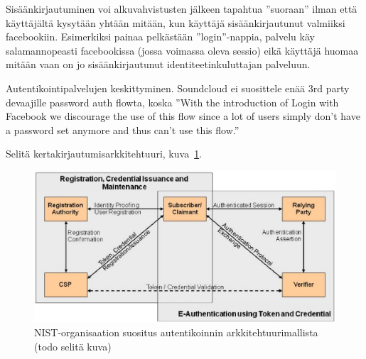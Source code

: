 \documentclass[finnish,gradu]{tktltiki}
\begin{document}
  Sisäänkirjautuminen voi alkuvahvistusten jälkeen tapahtua ''suoraan'' ilman että käyttäjältä kysytään yhtään mitään, kun käyttäjä sisäänkirjautunut valmiiksi facebookiin. Esimerkiksi painaa pelkästään ''login''-nappia, palvelu käy salamannopeasti facebookissa (jossa voimassa oleva sessio) eikä käyttäjä huomaa mitään vaan on jo sisäänkirjautunut identiteetinkuluttajan palveluun.

  Autentikointipalvelujen keskittyminen. Soundcloud ei suosittele enää 3rd party devaajille password auth flowta, koska ''With the introduction of Login with Facebook we discourage the use of this flow since a lot of users simply don't have a password set anymore and thus can't use this flow.''


  Selitä kertakirjautumisarkkitehtuuri, kuva~\ref{fig:kertakirjautumisarkkitehtuurin_yleiskuva}.
  \begin{figure}
    \centering
    \includegraphics[width=1.0\textwidth]{images/NIST_authentication_architectural_model.jpg}
    \caption{NIST-organisaation suositus autentikoinnin arkkitehtuurimallista~\cite{NIST_SP800-63-1} (todo selitä kuva) }
    \label{fig:kertakirjautumisarkkitehtuurin_yleiskuva}
  \end{figure}



\end{document}
